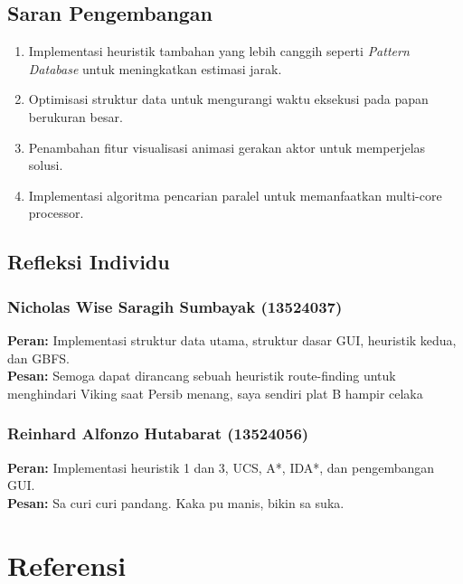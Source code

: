 \documentclass[12pt,a4paper]{article}
\newcommand{\MemberA}{Nicholas Wise Saragih Sumbayak (13524037)}
\newcommand{\MemberB}{Reinhard Alfonzo Hutabarat (13524056)}
\begin{document}
\subsection{Saran Pengembangan}
\begin{enumerate}[label=\arabic*., leftmargin=2em]
  \item Implementasi heuristik tambahan yang lebih canggih seperti \textit{Pattern Database} untuk meningkatkan estimasi jarak.
  \item Optimisasi struktur data untuk mengurangi waktu eksekusi pada papan berukuran besar.
  \item Penambahan fitur visualisasi animasi gerakan aktor untuk memperjelas solusi.
  \item Implementasi algoritma pencarian paralel untuk memanfaatkan multi-core processor.
\end{enumerate}

\subsection{Refleksi Individu}

\subsubsection{\MemberA}
\textbf{Peran:} Implementasi struktur data utama, struktur dasar GUI, heuristik
kedua, dan GBFS. \\
\textbf{Pesan:} Semoga dapat dirancang sebuah heuristik route-finding untuk menghindari Viking
saat Persib menang, saya sendiri plat B hampir celaka

\subsubsection{\MemberB}
\textbf{Peran:} Implementasi heuristik 1 dan 3, UCS, A*, IDA*, dan pengembangan
GUI.\\
\textbf{Pesan:} Sa curi curi pandang. Kaka pu manis, bikin sa suka.

\newpage
{}
\section*{Referensi}
\end{document}

